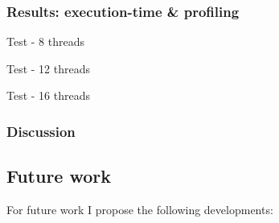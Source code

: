 % 
\subsubsection{Results: execution-time \& profiling}

Test - 8 threads
\newline \newline
\renewcommand{\arraystretch}{1.2}
{\footnotesize\tt

}

Test - 12 threads
\newline \newline
\renewcommand{\arraystretch}{1.2}
{\footnotesize\tt

}

Test - 16 threads
\newline \newline
\renewcommand{\arraystretch}{1.2}
{\footnotesize\tt

}

% 
\subsubsection*{Discussion}

\subsection{Future work}

For future work I propose the following developments:

